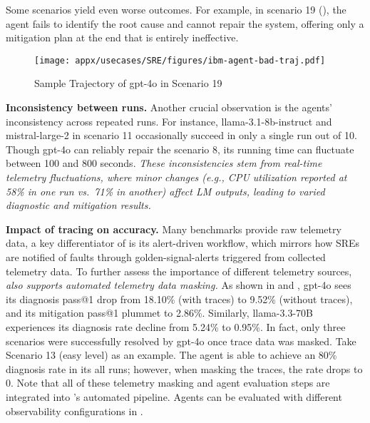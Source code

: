 Some scenarios yield even worse outcomes. For example, in scenario 19 (), the agent fails to identify the root cause and cannot repair the system, offering only a mitigation plan at the end that is entirely ineffective.



\begin{figure}[ht]
    \centering
    \texttt{[image: appx/usecases/SRE/figures/ibm-agent-bad-traj.pdf]}
    \caption{Sample Trajectory of gpt-4o in Scenario 19} 
    \label{fig:incident-19}
\end{figure} 





\textbf{Inconsistency between runs.} Another crucial observation is the agents' inconsistency across repeated runs. For instance, llama-3.1-8b-instruct and mistral-large-2 in scenario 11 occasionally succeed in only a single run out of 10. Though gpt-4o can reliably repair the scenario 8, its running time can fluctuate between 100 and 800 seconds. \textit{These inconsistencies stem from real-time telemetry fluctuations, where minor changes (e.g., CPU utilization reported at 58\% in one run vs.\ 71\% in another) affect LM outputs, leading to varied diagnostic and mitigation results.}












\textbf{Impact of tracing on accuracy.}
Many benchmarks provide raw telemetry data, a key differentiator of \bench is its alert-driven workflow, which mirrors how SREs are notified of faults through golden-signal-alerts triggered from collected telemetry data. To further assess the importance of different telemetry sources, \textit{\bench also supports automated telemetry data masking.} 
As shown in  and , gpt-4o sees its diagnosis pass@1 drop from 18.10\% (with traces) to 9.52\% (without traces), and its mitigation pass@1 plummet to 2.86\%. Similarly, llama-3.3-70B experiences its diagnosis rate decline from 5.24\% to 0.95\%.
In fact, only three  scenarios were successfully resolved by gpt-4o once trace data was masked.
Take Scenario 13 (easy level) as an example. The agent is able to achieve an 80\% diagnosis rate in its all runs; however, when masking the traces, the rate drops to 0. Note that all of these telemetry masking and agent evaluation steps are integrated into \bench’s automated pipeline. Agents can be evaluated with different observability configurations in \bench.



